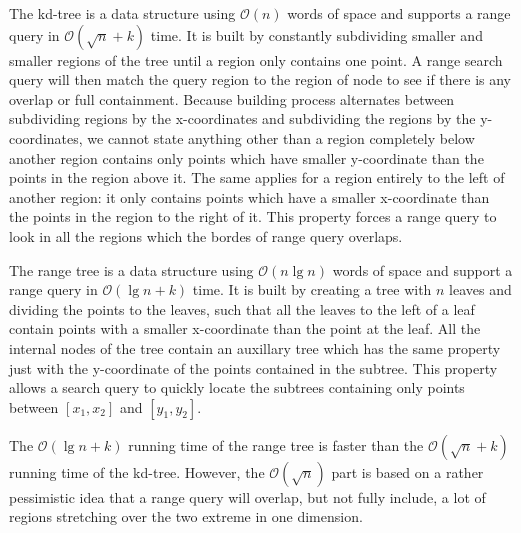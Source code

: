 The kd-tree is a data structure using $\mathcal{O}(n)$ words of space and supports a range query in $\mathcal{O}(\sqrt{n} + k)$ time. It is built by constantly subdividing smaller and smaller regions of the tree until a region only contains one point. A range search query will then match the query region to the region of node to see if there is any overlap or full containment. Because building process alternates between subdividing regions by the x-coordinates and subdividing the regions by the y-coordinates, we cannot state anything other than a region completely below another region contains only points which have smaller y-coordinate than the points in the region above it. The same applies for a region entirely to the left of another region: it only contains points which have a smaller x-coordinate than the points in the region to the right of it. This property forces a range query to look in all the regions which the bordes of range query overlaps. 

The range tree is a data structure using $\mathcal{O}(n \lg n)$ words of space and support a range query in $\mathcal{O}(\lg n + k)$ time. It is built by creating a tree with $n$ leaves and dividing the points to the leaves, such that all the leaves to the left of a leaf contain points with a smaller x-coordinate than the point at the leaf. All the internal nodes of the tree contain an auxillary tree which has the same property just with the y-coordinate of the points contained in the subtree. This property allows a search query to quickly locate the subtrees containing only points between $[x_1, x_2]$ and $[y_1, y_2]$.

The $\mathcal{O}(\lg n + k)$ running time of the range tree is faster than the $\mathcal{O}(\sqrt{n} + k)$ running time of the kd-tree. However, the $\mathcal{O}(\sqrt{n})$ part is based on a rather pessimistic idea that a range query will overlap, but not fully include, a lot of regions stretching over the two extreme in one dimension.
